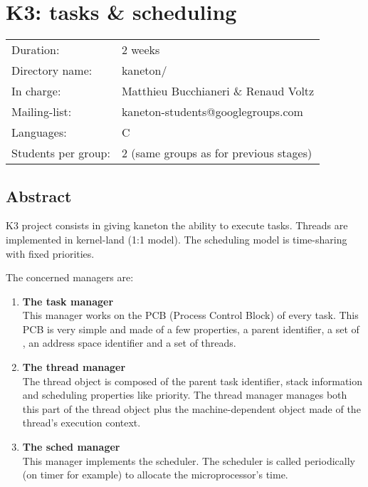 
%
%

\chapter{K3: tasks \& scheduling}

%
%

\begin{tabular}{p{7cm}l}
Duration: & 2 weeks \\
Directory name: & kaneton/ \\
In charge: & Matthieu Bucchianeri \& Renaud Voltz\\
Mailing-list: & kaneton-students@googlegroups.com \\
Languages: & C \\
Students per group: & 2 (same groups as for previous stages) \\
\end{tabular}

\section{Abstract}

K3 project consists in giving kaneton the ability to execute
tasks. Threads are implemented in kernel-land (1:1 model). The
scheduling model is time-sharing with fixed priorities.

The concerned managers are:

\begin{enumerate}
  \item
    {\bf The task manager}\\
    This manager works on the PCB (Process Control Block) of every
    task. This PCB is very simple and made of a few properties, a
    parent identifier, a set of , an address space identifier
    and a set of threads.
  \item
    {\bf The thread manager}\\
    The thread object is composed of the parent task identifier, stack
    information and scheduling properties like priority. The thread
    manager manages both this part of the thread object plus the
    machine-dependent object made of the thread's execution context.
  \item
    {\bf The sched manager}\\ This manager implements the
    scheduler. The scheduler is called periodically (on timer for
    example) to allocate the microprocessor's time.
\end{enumerate}

